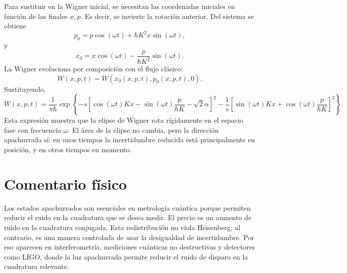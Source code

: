 \documentclass[11pt]{article}
\begin{document}
Para sustituir en la Wigner inicial, se necesitan las coordenadas iniciales
en funci\'on de las finales $x,p$. Es decir, se invierte la rotaci\'on
anterior. Del sistema se obtiene
\begin{equation}
  p_0=p\cos(\omega t)+\hbar K^2x\sin(\omega t),
\end{equation}
y
\begin{equation}
  x_0=x\cos(\omega t)-\frac{p}{\hbar K^2}\sin(\omega t).
\end{equation}
La Wigner evoluciona por composici\'on con el flujo cl\'asico:
\begin{equation}
  W(x,p,t)=W(x_0(x,p,t),p_0(x,p,t),0).
\end{equation}
Sustituyendo,
\begin{equation}
  \boxed{
  W(x,p,t)
  =
  \frac{1}{\pi\hbar}
  \exp\left\{
  -s\left[
  \cos(\omega t)Kx-\sin(\omega t)\frac{p}{\hbar K}
  -\sqrt2\alpha
  \right]^2
  -\frac{1}{s}\left[
  \sin(\omega t)Kx+\cos(\omega t)\frac{p}{\hbar K}
  \right]^2
  \right\}.
  }
\end{equation}
Esta expresi\'on muestra que la elipse de Wigner rota r\'igidamente en el
espacio fase con frecuencia $\omega$. El \'area de la elipse no cambia, pero
la direcci\'on apachurrada s\'i: en unos tiempos la incertidumbre reducida est\'a
principalmente en posici\'on, y en otros tiempos en momento.

\section{Comentario f\'isico}

Los estados apachurrados son esenciales en metrolog\'ia cu\'antica porque
permiten reducir el ruido en la cuadratura que se desea medir. El precio es
un aumento de ruido en la cuadratura conjugada. Esta redistribuci\'on no viola
Heisenberg; al contrario, es una manera controlada de usar la desigualdad de
incertidumbre. Por eso aparecen en interferometr\'ia, mediciones cu\'anticas no
destructivas y detectores como LIGO, donde la luz apachurrada permite reducir
el ruido de disparo en la cuadratura relevante.
\end{document}
